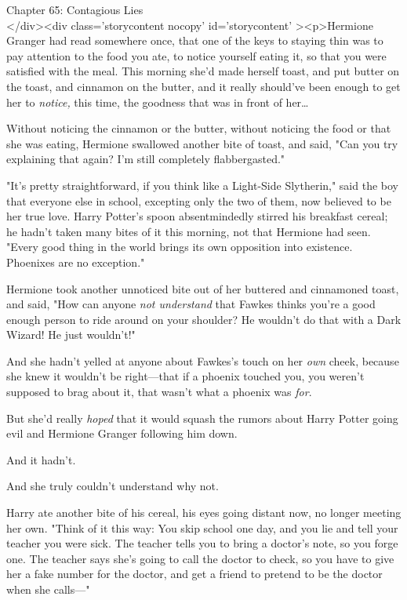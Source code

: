 
Chapter 65: Contagious Lies\\
</div><div  class='storycontent nocopy' id='storycontent' ><p>Hermione Granger 
had read somewhere once, that one of the keys to staying thin was to pay 
attention to the food you ate, to notice yourself eating it, so that you were 
satisfied with the meal. This morning she'd made herself toast, and put butter 
on the toast, and cinnamon on the butter, and it really should've been enough 
to get her to \emph{notice,} this time, the goodness that was in front of 
her{\ldots}

Without noticing the cinnamon or the butter, without noticing the food or that 
she was eating, Hermione swallowed another bite of toast, and said, "Can you 
try explaining that again? I'm still completely flabbergasted."

"It's pretty straightforward, if you think like a Light-Side Slytherin," said 
the boy that everyone else in school, excepting only the two of them, now 
believed to be her true love. Harry Potter's spoon absentmindedly stirred his 
breakfast cereal; he hadn't taken many bites of it this morning, not that 
Hermione had seen. "Every good thing in the world brings its own opposition 
into existence. Phoenixes are no exception."

Hermione took another unnoticed bite out of her buttered and cinnamoned toast, 
and said, "How can anyone \emph{not understand} that Fawkes thinks you're a 
good enough person to ride around on your shoulder? He wouldn't do that with a 
Dark Wizard! He just wouldn't!"

And she hadn't yelled at anyone about Fawkes's touch on her \emph{own} cheek, 
because she knew it wouldn't be right---that if a phoenix touched you, you 
weren't supposed to brag about it, that wasn't what a phoenix was \emph{for}.

But she'd really \emph{hoped} that it would squash the rumors about Harry 
Potter going evil and Hermione Granger following him down.

And it hadn't.

And she truly couldn't understand why not.

Harry ate another bite of his cereal, his eyes going distant now, no longer 
meeting her own. "Think of it this way: You skip school one day, and you lie 
and tell your teacher you were sick. The teacher tells you to bring a doctor's 
note, so you forge one. The teacher says she's going to call the doctor to 
check, so you have to give her a fake number for the doctor, and get a friend 
to pretend to be the doctor when she calls---"

